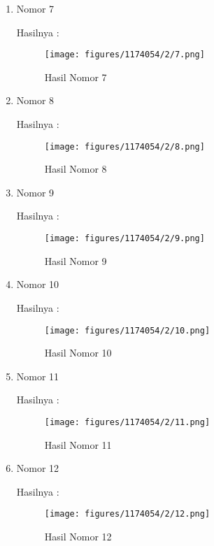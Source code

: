\begin{enumerate}
\item Nomor 7
\hfill\break
	
Hasilnya :
\begin{figure}[H]
		\texttt{[image: figures/1174054/2/7.png]}
		\centering
		\caption{Hasil Nomor 7}
\end{figure}

\item Nomor 8
\hfill\break
	
Hasilnya :
\begin{figure}[H]
		\texttt{[image: figures/1174054/2/8.png]}
		\centering
		\caption{Hasil Nomor 8}
\end{figure}

\item Nomor 9
\hfill\break
	
Hasilnya :
\begin{figure}[H]
		\texttt{[image: figures/1174054/2/9.png]}
		\centering
		\caption{Hasil Nomor 9}
\end{figure}

\item Nomor 10
\hfill\break
	
Hasilnya :
\begin{figure}[H]
		\texttt{[image: figures/1174054/2/10.png]}
		\centering
		\caption{Hasil Nomor 10}
\end{figure}

\item Nomor 11
\hfill\break
	
Hasilnya :
\begin{figure}[H]
		\texttt{[image: figures/1174054/2/11.png]}
		\centering
		\caption{Hasil Nomor 11}
\end{figure}

\item Nomor 12
\hfill\break
	
Hasilnya :
\begin{figure}[H]
		\texttt{[image: figures/1174054/2/12.png]}
		\centering
		\caption{Hasil Nomor 12}
\end{figure}
\end{enumerate}
